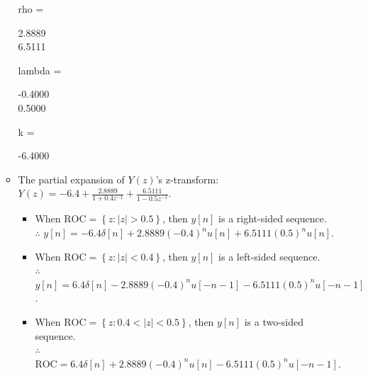 \documentclass[onecolumn,oneside]{SUSTechHomework}
\begin{document}
\begin{itemize}
\begin{itemize}
\begin{commandline}
            rho =
            
                2.8889\\
                6.5111
            
            
            lambda =
            
               -0.4000\\
                0.5000
            
            
            k =
            
               -6.4000            
        \end{commandline}
        \item The partial expansion of $Y(z)$'s z-transform: $Y(z)=-6.4+\frac{2.8889}{1+0.4z^{-1}}+\frac{6.5111}{1-0.5z^{-1}}$.
        \begin{itemize}
            \item When $\text{ROC}=\left\{z:|z|>0.5\right\}$, then $y[n]$ is a right-sided sequence.\\
            $\therefore$ $y[n]=-6.4\delta[n]+2.8889(-0.4)^nu[n]+6.5111(0.5)^nu[n]$.
            \item When $\text{ROC}=\left\{z:|z|<0.4\right\}$, then $y[n]$ is a left-sided sequence.\\
            $\therefore$ $y[n]=6.4\delta[n]-2.8889(-0.4)^nu[-n-1]-6.5111(0.5)^nu[-n-1]$.
            \item When $\text{ROC}=\left\{z:0.4<|z|<0.5\right\}$, then $y[n]$ is a two-sided sequence.\\
            $\therefore$ $\text{ROC}=6.4\delta[n]+2.8889(-0.4)^nu[n]-6.5111(0.5)^nu[-n-1]$.
        \end{itemize} 
    \end{itemize}
\end{itemize}
\end{document}
